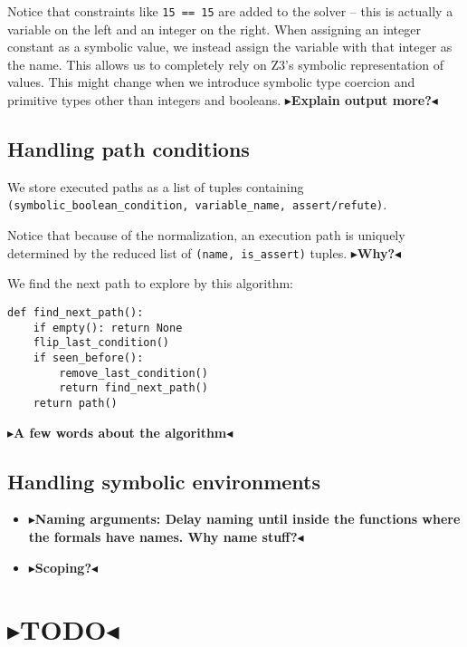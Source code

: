 \documentclass[11pt]{report}
\newcommand{\todo}[1]{{\color[rgb]{.5,0,0}\textbf{$\blacktriangleright$#1$\blacktriangleleft$}}}
\begin{document}
Notice that constraints like \verb|15 == 15| are added to the solver
-- this is actually a variable on the left and an integer on the
right. When assigning an integer constant as a symbolic value, we
instead assign the variable with that integer as the name. This allows
us to completely rely on Z3's symbolic representation of values. This
might change when we introduce symbolic type coercion and primitive
types other than integers and booleans. \todo{Explain output more?}

\section{Handling path conditions}
We store executed paths as a list of tuples containing \\
\verb|(symbolic_boolean_condition, variable_name, assert/refute)|.

Notice that because of the normalization, an execution path is
uniquely determined by the reduced list of \verb|(name, is_assert)|
tuples. \todo{Why?}

We find the next path to explore by this algorithm:
\begin{verbatim}
def find_next_path():
    if empty(): return None
    flip_last_condition()
    if seen_before():
        remove_last_condition()
        return find_next_path()
    return path()
\end{verbatim}

\todo{A few words about the algorithm}

\section{Handling symbolic environments}
\begin{itemize}
\item \todo{Naming arguments: Delay naming until inside the functions
  where the formals have names. Why name stuff?}
\item \todo{Scoping?}
\end{itemize}


\chapter{\todo{TODO}}
\end{document}
